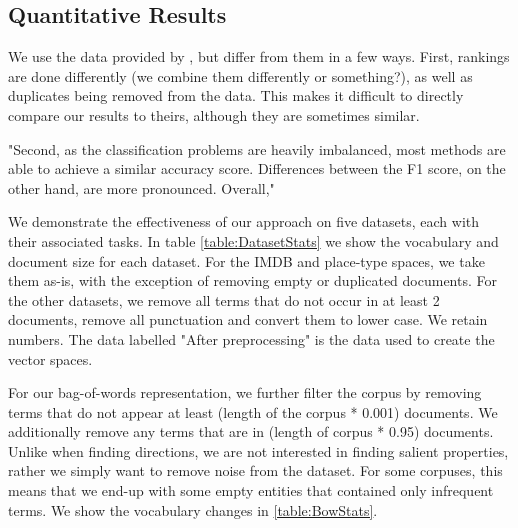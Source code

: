 

\subsection{Quantitative Results}
We use the data provided by \cite{Derrac2015}, but differ from them in a few ways. First, rankings are done differently (we combine them differently or something?), as well as duplicates being removed from the data. This makes it difficult to directly compare our results to theirs, although they are sometimes similar.

"Second, as the classification problems are heavily imbalanced, most methods are able to achieve a similar accuracy score. Differences between the F1 score, on the other hand, are more pronounced. Overall," \cite{Derrac2015}

We demonstrate the effectiveness of our approach on five datasets, each with their associated tasks. In table \ref{table:DatasetStats} we show the vocabulary and document size for each dataset. For the IMDB and place-type spaces, we take them as-is, with the exception of removing empty or duplicated documents. For the other datasets, we remove all terms that do not occur in at least 2 documents, remove all punctuation and convert them to lower case. We retain numbers. The data labelled "After preprocessing" is the data used to create the vector spaces. 

For our bag-of-words representation, we further filter the corpus by removing terms that do not appear at least (length of the corpus * 0.001) documents. We additionally remove any terms that are in (length of corpus * 0.95) documents. Unlike when finding directions, we are not interested in finding salient properties, rather we simply want to remove noise from the dataset. For some corpuses, this means that we end-up with some empty entities that contained only infrequent terms. We show the vocabulary changes in \ref{table:BowStats}.

